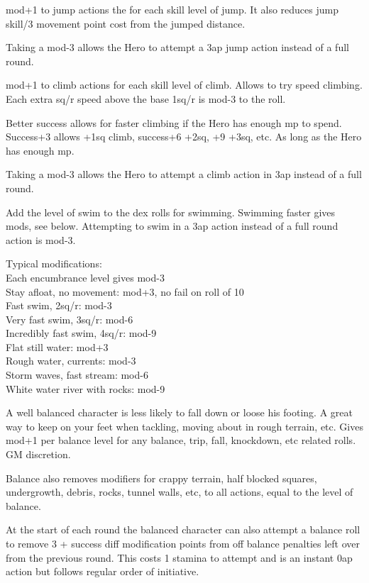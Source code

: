  mod+1 to jump actions the for each skill level of jump. It also reduces jump skill/3 movement point cost from the jumped distance.

Taking a mod-3 allows the Hero to attempt a 3ap jump action instead of a full round.


 mod+1 to climb actions for each skill level of climb. Allows to try speed climbing. Each extra sq/r speed above the base 1sq/r is mod-3 to the roll.

Better success allows for faster climbing if the Hero has enough mp to spend. Success+3 allows +1sq climb, success+6 +2sq, +9 +3sq, etc. As long as the Hero has enough mp.

Taking a mod-3 allows the Hero to attempt a climb action in 3ap instead of a full round.


Add the level of swim to the dex rolls for swimming. Swimming faster gives mods, see below. Attempting to swim in a 3ap action instead of a full round action is mod-3.

Typical modifications:\\
Each encumbrance level gives mod-3\\
Stay afloat, no movement: mod+3, no fail on roll of 10\\
Fast swim, 2sq/r: mod-3\\
Very fast swim, 3sq/r: mod-6\\
Incredibly fast swim, 4sq/r: mod-9\\
Flat still water: mod+3\\
Rough water, currents: mod-3\\
Storm waves, fast stream: mod-6\\
White water river with rocks: mod-9


 A well balanced character is less likely to fall down or loose his footing. A great way to keep on your feet when tackling, moving about in rough terrain, etc. Gives mod+1 per balance level for any balance, trip, fall, knockdown, etc related rolls. GM discretion.

Balance also removes modifiers for crappy terrain, half blocked squares, undergrowth, debris, rocks, tunnel walls, etc, to all actions, equal to the level of balance.

At the start of each round the balanced character can also attempt a balance roll to remove 3 + success diff modification points from off balance penalties left over from the previous round. This costs 1 stamina to attempt and is an instant 0ap action but follows regular order of initiative.


